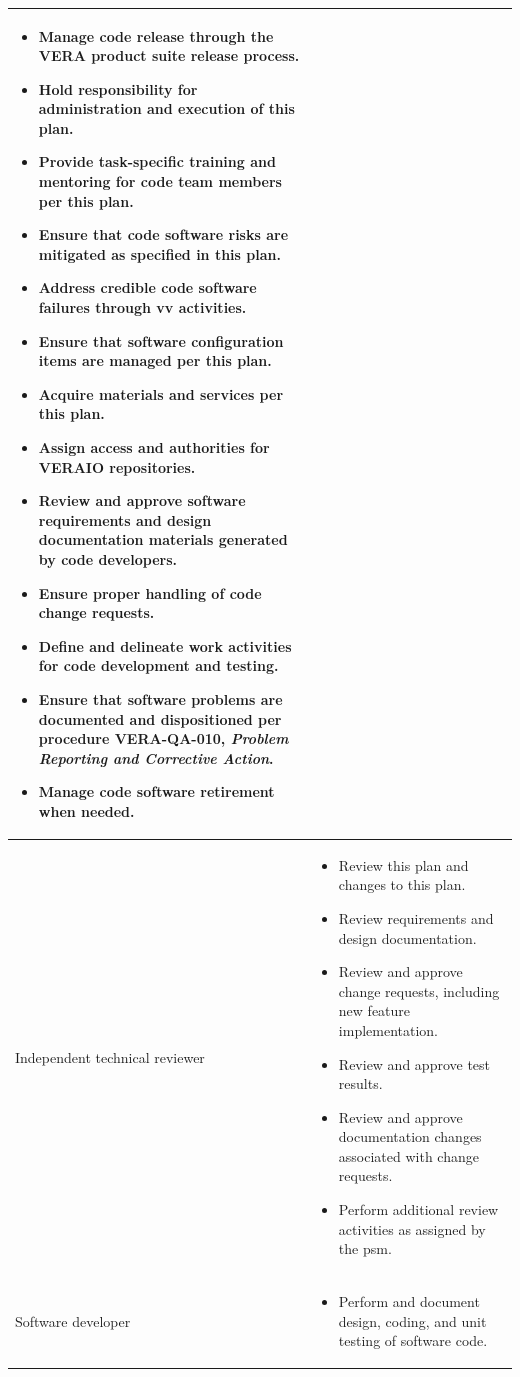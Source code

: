 \documentclass{vera-ornltm}
\begin{document}
\begin{longtable}{>{\raggedleft}p{}p{}}
\begin{itemize}
\item Manage code release through the VERA product suite release process.
\item Hold responsibility for administration and execution of this plan.
\item Provide task-specific training and mentoring for code team members per this plan.
\item Ensure that code software risks are mitigated as specified in this plan.
\item Address credible code software failures through \ac{vv} activities.
\item Ensure that software configuration items are managed per this plan.
\item Acquire materials and services per this plan.
\item Assign access and authorities for VERAIO repositories.
\item Review and approve software requirements and design documentation materials generated by code developers.
\item Ensure proper handling of code change requests.
\item Define and delineate work activities for code development and testing.
\item Ensure that software problems are documented and dispositioned per procedure VERA-QA-010,  {\it Problem Reporting and Corrective Action}.
\item Manage code software retirement when needed.
\end{itemize}\\
\midrule
Independent technical reviewer &%
\begin{itemize}[topsep=0pt]
\item Review this plan and changes to this plan.
\item Review requirements and design documentation.
\item Review and approve change requests, including new feature implementation.
\item Review and approve test results.
\item Review and approve documentation changes associated with change requests.
\item Perform additional review activities as assigned by the \ac{psm}.
\end{itemize}\\
\midrule
Software developer &%
\begin{itemize}
\item Perform and document design, coding, and unit testing of software code.

\end{itemize}
\end{longtable}
\end{document}
